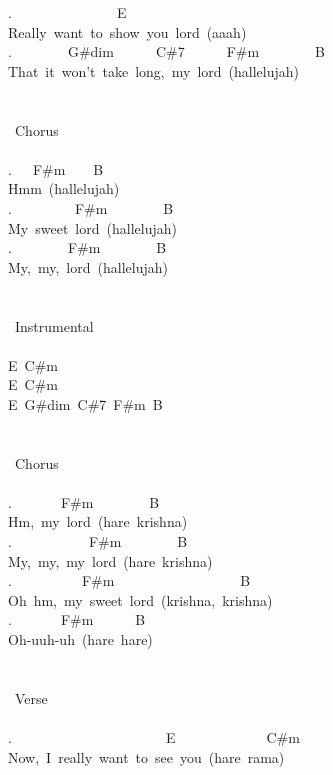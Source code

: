 {.\ \ \ \ \ \ \ \ \ \ \ \ \ \ \ E\ \ \ \ \ \ \ \ \ \ \ \ \ \ \ \\
Really\ want\ to\ show\ you\ lord\ (aaah)\\
.\ \ \ \ \ \ \ \ G\#dim\ \ \ \ \ \ C\#7\ \ \ \ \ \ F\#m\ \ \ \ \ \ \ \ B\\
That\ it\ won't\ take\ long,\ my\ lord\ (hallelujah)\\
\\
\\
\lbrack\ Chorus\rbrack\\
\\
.\ \ \ F\#m\ \ \ \ B\\
Hmm\ (hallelujah)\\
.\ \ \ \ \ \ \ \ \ F\#m\ \ \ \ \ \ \ \ B\\
My\ sweet\ lord\ (hallelujah)\\
.\ \ \ \ \ \ \ \ F\#m\ \ \ \ \ \ \ \ B\\
My,\ my,\ lord\ (hallelujah)\\
\\
\\
\lbrack\ Instrumental\rbrack\\
\\
E\ C\#m\\
E\ C\#m\\
E\ G\#dim\ C\#7\ F\#m\ B\\
\\
\\
\lbrack\ Chorus\rbrack\\
\\
.\ \ \ \ \ \ \ F\#m\ \ \ \ \ \ \ \ B\ \\
Hm,\ my\ lord\ (hare\ krishna)\\
.\ \ \ \ \ \ \ \ \ \ \ F\#m\ \ \ \ \ \ \ \ B\\
My,\ my,\ my\ lord\ (hare\ krishna)\\
.\ \ \ \ \ \ \ \ \ \ F\#m\ \ \ \ \ \ \ \ \ \ \ \ \ \ \ \ \ \ B\ \\
Oh\ hm,\ my\ sweet\ lord\ (krishna,\ krishna)\\
.\ \ \ \ \ \ \ F\#m\ \ \ \ \ \ B\\
Oh-uuh-uh\ (hare\ hare)\\
\\
\\
\lbrack\ Verse\rbrack\\
\\
.\ \ \ \ \ \ \ \ \ \ \ \ \ \ \ \ \ \ \ \ \ \ E\ \ \ \ \ \ \ \ \ \ \ \ \ C\#m\ \\
Now,\ I\ really\ want\ to\ see\ you\ (hare\ rama)\\
}

